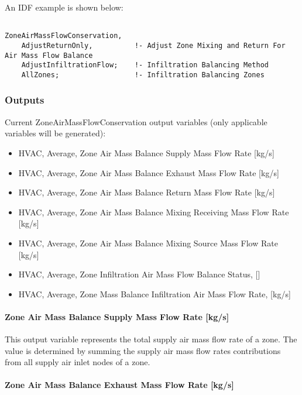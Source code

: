 An IDF example is shown below:

\begin{lstlisting}

ZoneAirMassFlowConservation,
    AdjustReturnOnly,          !- Adjust Zone Mixing and Return For Air Mass Flow Balance
    AdjustInfiltrationFlow;    !- Infiltration Balancing Method
    AllZones;                  !- Infiltration Balancing Zones
\end{lstlisting}

\subsubsection{Outputs}\label{outputs-7-000}

Current ZoneAirMassFlowConservation output variables (only applicable variables will be generated):

\begin{itemize}
\item
  HVAC, Average, Zone Air Mass Balance Supply Mass Flow Rate {[}kg/s{]}
\item
  HVAC, Average, Zone Air Mass Balance Exhaust Mass Flow Rate {[}kg/s{]}
\item
  HVAC, Average, Zone Air Mass Balance Return Mass Flow Rate {[}kg/s{]}
\item
  HVAC, Average, Zone Air Mass Balance Mixing Receiving Mass Flow Rate {[}kg/s{]}
\item
  HVAC, Average, Zone Air Mass Balance Mixing Source Mass Flow Rate {[}kg/s{]}
\item
  HVAC, Average, Zone Infiltration Air Mass Flow Balance Status, {[]}
\item
  HVAC, Average, Zone Mass Balance Infiltration Air Mass Flow Rate, {[}kg/s{]}
\end{itemize}

\paragraph{Zone Air Mass Balance Supply Mass Flow Rate {[}kg/s{]}}\label{zone-air-mass-balance-supply-mass-flow-rate-kgs}

This output variable represents the total supply air mass flow rate of a zone. The value is determined by summing the supply air mass flow rates contributions from all supply air inlet nodes of a zone.

\paragraph{Zone Air Mass Balance Exhaust Mass Flow Rate {[}kg/s{]}}\label{zone-air-mass-balance-exhaust-mass-flow-rate-kgs}

